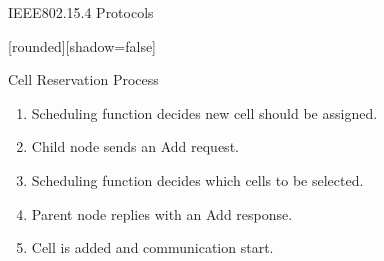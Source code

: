 \begin{withoutheadline}
\begin{frame}{IEEE802.15.4 Protocols}


[rounded][shadow=false]
\begin{block}{Cell Reservation Process}
    \begin{enumerate}
    
    
    \item  Scheduling function decides new cell should be assigned.
    \item<2-> Child node sends an Add request. 
    \item<3-> Scheduling function decides which cells to be selected. 
    \item<4-> Parent node replies with an Add response.
    \item<5-> Cell is added and communication start.
    \end{enumerate}
    \end{block}

\begin{figure}[p]

\end{figure}




\end{frame}
\end{withoutheadline}


